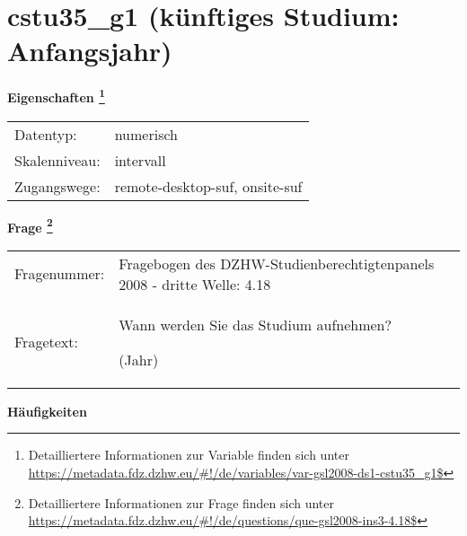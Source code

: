 
    \setcounter{footnote}{0}

    \vspace*{-1.8cm}
	\section{cstu35\_g1 (künftiges Studium: Anfangsjahr)}
	\label{section:cstu35_g1}



    \vspace*{0.5cm}
    \noindent\textbf{Eigenschaften
	\footnote{Detailliertere Informationen zur Variable finden sich unter
		\url{https://metadata.fdz.dzhw.eu/\#!/de/variables/var-gsl2008-ds1-cstu35_g1$}}}\\
	\begin{tabularx}{\hsize}{@{}lX}
	Datentyp: & numerisch \\
	Skalenniveau: & intervall \\
	Zugangswege: &
	  remote-desktop-suf, 
	  onsite-suf
 \\
    \end{tabularx}



				\vspace*{0.5cm}
                \noindent\textbf{Frage
	                \footnote{Detailliertere Informationen zur Frage finden sich unter
		              \url{https://metadata.fdz.dzhw.eu/\#!/de/questions/que-gsl2008-ins3-4.18$}}}\\
				\begin{tabularx}{\hsize}{@{}lX}
					Fragenummer: &
					  Fragebogen des DZHW-Studienberechtigtenpanels 2008 - dritte Welle:
					  4.18
 \\
					Fragetext: & Wann werden Sie das Studium aufnehmen?\par  (Jahr) \\
				\end{tabularx}





        		\vspace*{0.5cm}
                \noindent\textbf{Häufigkeiten}

